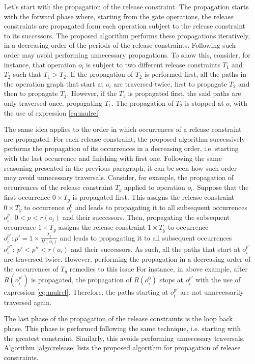 Let's start with the propagation of the release constraint. The propagation starts with the forward phase where, starting from the gate operations, the release constraints are propagated form each operation subject to the release constraint to its successors. The proposed algorithm performs these propagations iteratively, in a decreasing order of the periods of the release constraints. Following such order may avoid performing unnecessary propagations. To show this, consider, for instance, that operation $o_i$ is subject to two different release constraints $T_{1}$ and $T_{2}$ such that $T_{1} > T_{2}$. If the propagation of $T_{2}$ is performed first, all the paths in the operation graph that start at $o_i$ are traversed twice, first to propagate $T_{2}$ and then to propagate $T_{1}$. However, if the $T_{1}$ is propagated first, the said paths are only traversed once, propagating $T_{1}$. The propagation of $T_{2}$ is stopped at $o_i$ with the use of expression \ref{eq:mulrel}.

The same idea applies to the order in which occurrences of a release constraint are propagated. For each release constraint, the proposed algorithm successively performs the propagation of its occurrences in a decreasing order, i.e. starting with the last occurrence and finishing with first one. Following the same reasoning presented in the previous paragraph, it can be seen how such order may avoid unnecessary traversals. Consider, for example, the propagation of occurrences of the release constraint $T_y$ applied to operation $o_i$. Suppose that the first occurrence $0 \times T_y$ is propagated first. This assigns the release constraint $0 \times T_y$ to occurrence $o_i^0$ and leads to propagating it to all subsequent occurrences $o_i^{p}:\ 0 < p < r(o_i) $ and their successors. Then, propagating the subsequent occurrence $1 \times T_y$ assigns the release constraint $1 \times T_y$ to occurrence $o_i^{p'}: p' = 1 \times \frac{T_y}{H(o_i)}$ and leads to propagating it to all subsequent occurrences $o_i^{p''}:\ p' < p'' < r(o_i) $ and their successors. As such, all the paths that start at $o_i^{p'}$ are traversed twice. However, performing the propagation in a decreasing order of the occurrences of $T_y$ remedies to this issue For instance, in above example, after $R(o_i^{p'})$ is propagated, 
the propagation of $R(o_i^0)$ stops at $o_i^{p'}$ with the use of expression \ref{eq:mulrel}. Therefore, the paths starting at $o_i^{p'}$ are not unnecessarily traversed again.

The last phase of the propagation of the release constraints is the loop back phase. This phase is performed following the same technique, i.e. starting with the greatest constraint. Similarly, this avoids performing unnecessary traversals. Algorithm \ref{algo:release} lists the proposed algorithm for propagation of release constraints.

